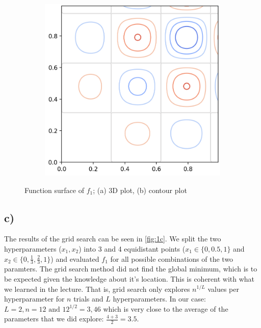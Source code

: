 \documentclass[11pt]{article}
\begin{document}
\begin{figure}[H]
\begin{subfigure}[b]{0.47\textwidth}
		\includegraphics[width=\textwidth]{assets/1b-contour}
		\caption{}
	\end{subfigure}
	\caption{Function surface of $f_1$; (a) 3D plot, (b) contour plot}
	\label{fig:1b}
\end{figure}

\subsection{c)}\label{subsec:basic-c}

The results of the grid search can be seen in \autoref{fig:1c}. We split the two hyperparameters ($x_1, x_2$) into 3 and 4 equidistant points ($x_1\in\{0, 0.5, 1\}$ and $x_2\in\{0, \frac{1}{3}, \frac{2}{3}, 1\}$) and evaluated $f_1$ for all possible combinations of the two paramters. The grid search method did not find the global minimum, which is to be expected given the knowledge about it's location. This is coherent with what we learned in the lecture. That is, grid search only explores $n^{1/L}$ values per hyperparameter for $n$ trials and $L$ hyperparameters. In our case: $L=2, n=12 \text{ and } 12^{1/2}=3,46$ which is very close to the average of the parameters that we did explore: $\frac{4+3}{2}=3.5$. 
\end{document}
